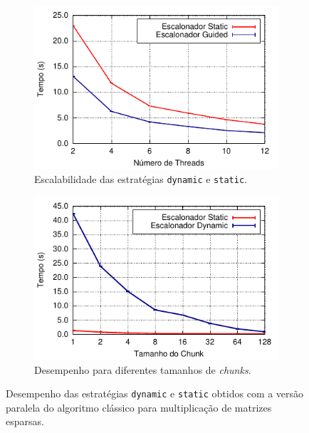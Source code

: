 \documentclass{SBCbookchapter}
\begin{document}
	
		\begin{figure}[t]
			\captionsetup[subfigure]{justification=centering}
			\centering
				\begin{subfigure}{0.45\linewidth}
					\includegraphics[width=\linewidth]{img/smm}
					\caption{Escalabilidade das estratégias \texttt{dynamic} e \texttt{static}.}
					\label{fig:static-dynamic-guided}
				\end{subfigure}
				\quad
				\begin{subfigure}{0.45\linewidth}
					\includegraphics[width=\linewidth]{img/chunk-size}
					\caption{Desempenho para diferentes tamanhos de
					\textit{chunks}.}
					\label{fig:chunk-size}
				\end{subfigure}
			\caption{Desempenho das estratégias \texttt{dynamic} e \texttt{static} obtidos com a versão paralela
			do algoritmo clássico para multiplicação de matrizes esparsas.}
		\end{figure}
\end{document}
